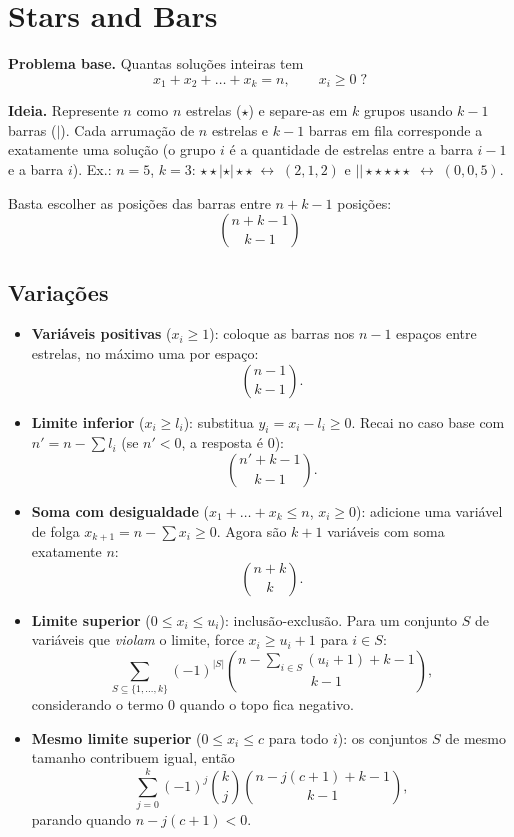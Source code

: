 \section{Stars and Bars}

\textbf{Problema base.} Quantas soluções inteiras tem
\[
x_1 + x_2 + \dots + x_k = n, \qquad x_i \ge 0 \;?
\]

\textbf{Ideia.} Represente $n$ como $n$ estrelas ($\star$) e separe-as em $k$ grupos
usando $k-1$ barras ($|$). Cada arrumação de $n$ estrelas e $k-1$ barras em fila
corresponde a exatamente uma solução (o grupo $i$ é a quantidade de estrelas
entre a barra $i-1$ e a barra $i$). Ex.: $n=5$, $k=3$: \;
$\star\star|\star|\star\star \;\leftrightarrow\; (2,1,2)$ \; e \;
$||\star\star\star\star\star \;\leftrightarrow\; (0,0,5)$.

Basta escolher as posições das barras entre $n+k-1$ posições:
\[
\boxed{\binom{n+k-1}{k-1}}
\]

\subsection*{Variações}

\begin{itemize}
  \item \textbf{Variáveis positivas} ($x_i \ge 1$): coloque as barras nos $n-1$ espaços
        entre estrelas, no máximo uma por espaço:
        \[ \binom{n-1}{k-1}. \]

  \item \textbf{Limite inferior} ($x_i \ge l_i$): substitua $y_i = x_i - l_i \ge 0$.
        Recai no caso base com $n' = n - \sum l_i$ (se $n' < 0$, a resposta é $0$):
        \[ \binom{n' + k - 1}{k-1}. \]

  \item \textbf{Soma com desigualdade} ($x_1 + \dots + x_k \le n$, $x_i \ge 0$):
        adicione uma variável de folga $x_{k+1} = n - \sum x_i \ge 0$. Agora são $k+1$ variáveis
        com soma exatamente $n$:
        \[ \binom{n+k}{k}. \]

  \item \textbf{Limite superior} ($0 \le x_i \le u_i$): inclusão-exclusão. Para um conjunto $S$
        de variáveis que \emph{violam} o limite, force $x_i \ge u_i + 1$ para $i \in S$:
        \[
        \sum_{S \subseteq \{1,\dots,k\}} (-1)^{|S|}
        \binom{n - \sum_{i \in S}(u_i+1) + k - 1}{k-1},
        \]
        considerando o termo $0$ quando o topo fica negativo.

  \item \textbf{Mesmo limite superior} ($0 \le x_i \le c$ para todo $i$): os conjuntos $S$ de
        mesmo tamanho contribuem igual, então
        \[
        \sum_{j=0}^{k} (-1)^j \binom{k}{j} \binom{n - j(c+1) + k - 1}{k-1},
        \]
        parando quando $n - j(c+1) < 0$.
\end{itemize}

